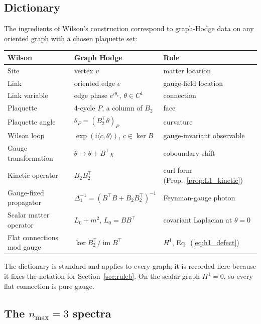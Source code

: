 \documentclass[11pt]{article}
\begin{document}
\subsection{Dictionary}

The ingredients of Wilson's construction correspond to graph-Hodge data on
any oriented graph with a chosen plaquette set:

\begin{center}
\begin{tabular}{lll}
\toprule
Wilson & Graph Hodge & Role \\
\midrule
Site & vertex $v$ & matter location \\
Link & oriented edge $e$ & gauge-field location \\
Link variable & edge phase $e^{i\theta_e}$, $\theta\in C^1$ & connection \\
Plaquette & 4-cycle $P$, a column of $B_2$ & face \\
Plaquette angle & $\theta_P=(B_2^{\top}\theta)_P$ & curvature \\
Wilson loop & $\exp(i\langle c,\theta\rangle)$, $c\in\ker B$ & gauge-invariant observable \\
Gauge transformation & $\theta\mapsto\theta+B^{\top}\chi$ & coboundary shift \\
Kinetic operator & $B_2B_2^{\top}$ & curl form (Prop.~\ref{prop:L1_kinetic}) \\
Gauge-fixed propagator & $\Delta_1^{-1}=(B^{\top}B+B_2B_2^{\top})^{-1}$ & Feynman-gauge photon \\
Scalar matter operator & $L_0+m^2$, $L_0=BB^{\top}$ & covariant Laplacian at $\theta=0$ \\
Flat connections mod gauge & $\ker B_2^{\top}/\operatorname{im}B^{\top}$ & $H^1$, Eq.~(\ref{eq:h1_defect}) \\
\bottomrule
\end{tabular}
\end{center}

\noindent The dictionary is standard and applies to every graph; it is
recorded here because it fixes the notation for Section~\ref{sec:ruleb}.  On
the scalar graph $H^1=0$, so every flat connection is pure gauge.

\subsection{The $n_{\max}=3$ spectra}
\label{sec:spectra}
\end{document}
